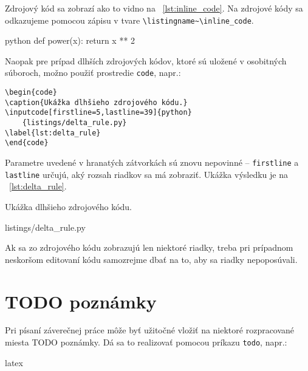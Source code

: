 Zdrojový kód sa zobrazí ako to vidno na \listingname~\ref{lst:inline_code}. Na zdrojové kódy sa odkazujeme pomocou zápisu v tvare \texttt{{\textbackslash}listingname\textasciitilde{\textbackslash}inline\_code}.

\begin{inlinecode}[label={lst:inline_code},
caption={Príklad krátkeho zdrojového kódu.}]{python}
def power(x):
	return x ** 2
\end{inlinecode}
Naopak pre prípad dlhších zdrojových kódov, ktoré sú uložené v osobitných súboroch, možno použiť prostredie \texttt{code}, napr.:
\begin{Verbatim}
\begin{code}
\caption{Ukážka dlhšieho zdrojového kódu.}
\inputcode[firstline=5,lastline=39]{python}
	{listings/delta_rule.py}
\label{lst:delta_rule}
\end{code}
\end{Verbatim}

Parametre uvedené v hranatých zátvorkách sú znovu nepovinné -- \texttt{firstline} a \texttt{lastline} určujú, aký rozsah riadkov sa má zobraziť. Ukážka výsledku je na \listingname~\ref{lst:delta_rule}.
\begin{code}
\caption{Ukážka dlhšieho zdrojového kódu.}
	{listings/delta_rule.py}
\label{lst:delta_rule}
\end{code}
Ak sa zo zdrojového kódu zobrazujú len niektoré riadky, treba pri prípadnom neskoršom editovaní kódu samozrejme dbať na to, aby sa riadky nepoposúvali.

\section{TODO poznámky}

Pri písaní záverečnej práce môže byť užitočné vložiť na niektoré rozpracované miesta TODO poznámky. Dá sa to realizovať pomocou príkazu \texttt{todo}, napr.:
\begin{inlinecode}{latex}
\end{inlinecode}

